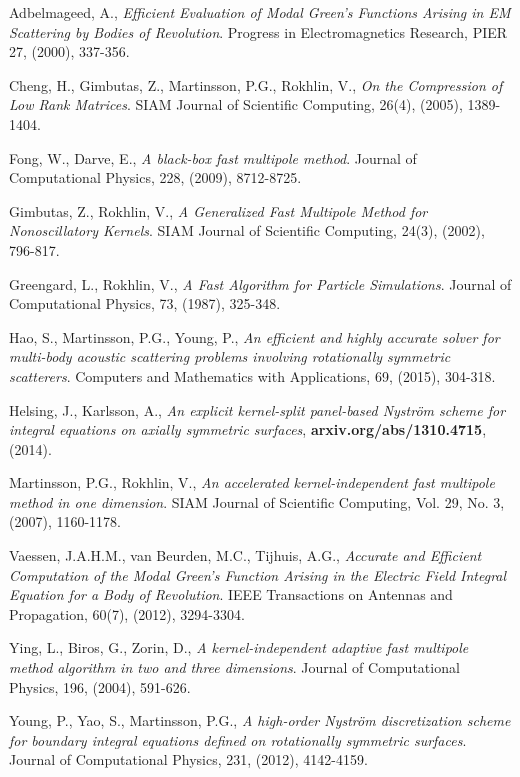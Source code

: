 \documentclass[11pt, oneside]{article}   	%
\begin{document}
\begin{thebibliography}{99}

 Adbelmageed, A., \emph{Efficient Evaluation of Modal Green's Functions Arising in EM Scattering by Bodies of Revolution}. Progress in Electromagnetics Research, PIER 27, (2000), 337-356.

 Cheng, H., Gimbutas, Z., Martinsson, P.G., Rokhlin, V., \emph{On the Compression of Low Rank Matrices}. SIAM Journal of Scientific Computing, 26(4), (2005), 1389-1404.

 Fong, W., Darve, E., \emph{A black-box fast multipole method}. Journal of Computational Physics, 228, (2009), 8712-8725.

 Gimbutas, Z., Rokhlin, V., \emph{A Generalized Fast Multipole Method for Nonoscillatory Kernels}. SIAM Journal of Scientific Computing, 24(3), (2002), 796-817.

 Greengard, L., Rokhlin, V., \emph{A Fast Algorithm for Particle Simulations}. Journal of Computational Physics, 73, (1987), 325-348.

 Hao, S., Martinsson, P.G., Young, P., \emph{An efficient and highly accurate solver for multi-body acoustic scattering problems involving rotationally symmetric scatterers}. Computers and Mathematics with Applications, 69, (2015), 304-318.

 Helsing, J., Karlsson, A., \emph{An explicit kernel-split panel-based Nystr{\"o}m scheme for integral equations on axially symmetric surfaces}, \textbf{arxiv.org/abs/1310.4715}, (2014).

 Martinsson, P.G., Rokhlin, V., \emph{An accelerated kernel-independent fast multipole method in one dimension}. SIAM Journal of Scientific Computing, Vol. 29, No. 3, (2007), 1160-1178.

 Vaessen, J.A.H.M., van Beurden, M.C., Tijhuis, A.G., \emph{Accurate and Efficient Computation of the Modal Green's Function Arising in the Electric Field Integral Equation for a Body of Revolution}. IEEE Transactions on Antennas and Propagation, 60(7), (2012), 3294-3304.

 Ying, L., Biros, G., Zorin, D., \emph{A kernel-independent adaptive fast multipole method algorithm in two and three dimensions}. Journal of Computational Physics, 196, (2004), 591-626.

 Young, P., Yao, S., Martinsson, P.G., \emph{A high-order Nystr{\"o}m discretization scheme for boundary integral equations defined on rotationally symmetric surfaces}. Journal of Computational Physics, 231, (2012), 4142-4159.

\end{thebibliography}
\end{document}

